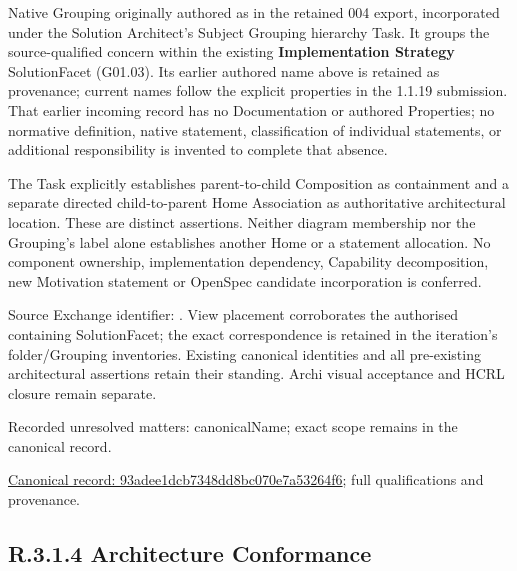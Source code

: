 Native Grouping originally authored as \texttt{} in the retained 004 export,
incorporated under the Solution Architect's Subject Grouping hierarchy Task.
It groups the source-qualified \texttt{} concern within
the existing \textbf{Implementation Strategy} SolutionFacet (G01.03). Its earlier authored name above is retained as provenance; current names
follow the explicit properties in the 1.1.19 submission.
That earlier incoming record has no Documentation or authored Properties; no normative
definition, native statement, classification of individual statements, or
additional responsibility is invented to complete that absence.



The Task explicitly establishes parent-to-child Composition as containment and
a separate directed child-to-parent Home Association as authoritative architectural
location. These are distinct assertions. Neither diagram membership nor the
Grouping's label alone establishes another Home or a statement allocation.
No component ownership, implementation dependency, Capability decomposition,
new Motivation statement or OpenSpec candidate incorporation is conferred.



Source Exchange identifier: \texttt{}. View placement corroborates
the authorised containing SolutionFacet; the exact correspondence is retained in the
iteration's folder/Grouping inventories. Existing canonical identities and all
pre-existing architectural assertions retain their standing. Archi visual
acceptance and HCRL closure remain separate.


{\small Recorded unresolved matters: canonicalName; exact scope remains in the canonical record.}\par
{\footnotesize \href{../../../../../../../continuum/grouping/93adee1dcb7348dd8bc070e7a53264f6.md}{Canonical record: 93adee1dcb7348dd8bc070e7a53264f6}; full qualifications and provenance.}\par
\subsection*{R.3.1.4 Architecture Conformance}
\label{navigation:R.3.1.4}

